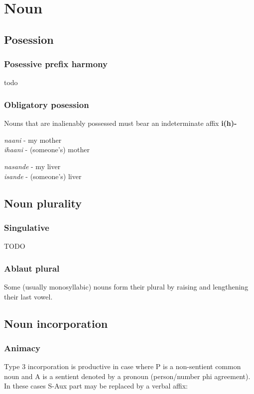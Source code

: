 \documentclass[8pt]{book}
\begin{document}
\chapter{Noun}
\section{Posession}

\subsection{Posessive prefix harmony}

todo

\subsection{Obligatory posession}

Nouns that are inalienably possessed must bear an indeterminate affix \textbf{i(h)-}

\begin{exe}
\ex \textit{naani} - my mother \\
 \textit{ihaani} - (someone's) mother

\ex \textit{nasande} - my liver \\
 \textit{isande} - (someone's) liver

\end{exe}


\section{Noun plurality}
\subsection{Singulative}
TODO

\subsection{Ablaut plural}
Some (usually monosyllabic) nouns form their plural by raising and lengthening their last vowel.



\section{Noun incorporation}

\subsection{Animacy}
Type 3 incorporation is productive in case where P is a non-sentient common noun and A is a sentient denoted by a pronoun (person/number phi agreement). In these cases S-Aux part may be replaced by a verbal affix:
\end{document}
